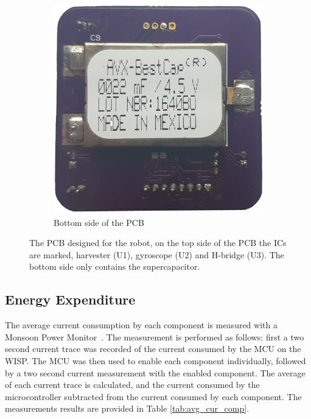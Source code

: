 \begin{figure}[h!]
\begin{subfigure}[b]{0.45\textwidth}
		\includegraphics[width=\textwidth]{pics/pcb_back.jpg}
		\caption{Bottom side of the PCB}
		\label{fig:pcb_robot_back}
	\end{subfigure}
	\caption{The PCB designed for the robot, on the top side of the PCB the ICs are marked, harvester (U1), gyroscope (U2) and H-bridge (U3). The bottom side only contains the supercapacitor.}
	\label{fig:pcb_robot}
\end{figure}

\subsection{Energy Expenditure}

The average current consumption by each component is measured with a Monsoon Power Monitor~\cite{monsoon_powermonitor_2017}.
The measurement is performed as follows: first a two second current trace was recorded of the current consumed by the MCU on the WISP.
The MCU was then used to enable each component individually, followed by a two second current measurement with the enabled component.
The average of each current trace is calculated, and the current consumed by the microcontroller subtracted from the current consumed by each component.
The measurements results are provided in Table \ref{tab:avg_cur_comp}.


